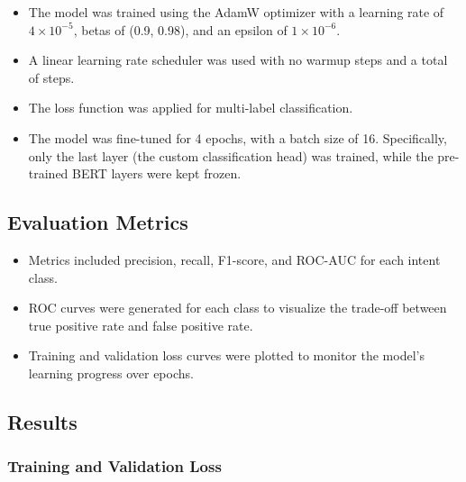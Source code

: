         \begin{itemize}
        
            \item The model was trained using the AdamW optimizer with a learning rate of $4 \times 10^{-5}$, betas of (0.9, 0.98), and an epsilon of $1 \times 10^{-6}$.

            \item A linear learning rate scheduler was used with no warmup steps and a total of  steps.

            \item The  loss function was applied for multi-label classification.

            \item The model was fine-tuned for 4 epochs, with a batch size of 16. Specifically, only the last layer (the custom classification head) was trained, while the pre-trained BERT layers were kept frozen. 
            
        \end{itemize}

        \subsection{Evaluation Metrics}

        \begin{itemize}
        
            \item Metrics included precision, recall, F1-score, and ROC-AUC for each intent class.

            \item ROC curves were generated for each class to visualize the trade-off between true positive rate and false positive rate.

            \item Training and validation loss curves were plotted to monitor the model's learning progress over epochs.
            
        \end{itemize}
        

    \subsection{Results}

        \subsubsection{Training and Validation Loss \\}

